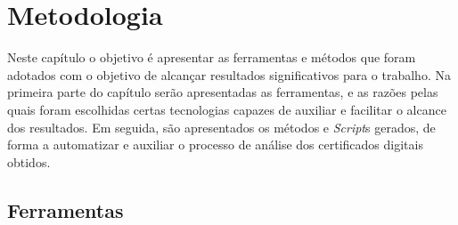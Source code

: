 
 

\chapter[Metodologia]{Metodologia}
	
	Neste capítulo o objetivo é apresentar as ferramentas e métodos que foram adotados com o objetivo de alcançar resultados significativos para o trabalho. Na primeira parte do capítulo serão apresentadas as ferramentas, e as razões pelas quais foram escolhidas certas tecnologias capazes de auxiliar e facilitar o alcance dos resultados. Em seguida, são apresentados os métodos e \textit{Script}s gerados, de forma a automatizar e auxiliar o processo de análise dos certificados digitais obtidos.
	
	\section[Ferramentas]{Ferramentas}
	
